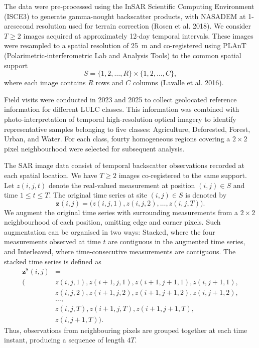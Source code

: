 \documentclass[
  conference]{IEEEtran}
\begin{document}
The data were pre-processed using the InSAR Scientific Computing
Environment (ISCE3) to generate gamma-nought backscatter products, with
NASADEM at 1-arcsecond resolution used for terrain correction (Rosen et
al. 2018). We consider \(T\geq2\) images acquired at approximately
12-day temporal intervals. These images were resampled to a spatial
resolution of \SI{25}{\meter} and co-registered using PLAnT
(Polarimetric-interferometric Lab and Analysis Tools) to the common
spatial support \[
S=\{1,2,\dots,R\}\times\{1,2,\dots,C\},
\] where each image contains \(R\) rows and \(C\) columns (Lavalle et
al. 2016).

Field visits were conducted in 2023 and 2025 to collect geolocated
reference information for different LULC classes. This information was
combined with photo-interpretation of temporal high-resolution optical
imagery to identify representative samples belonging to five classes:
Agriculture, Deforested, Forest, Urban, and Water. For each class,
fourty homogeneous regions covering a \(2\times2\) pixel neighbourhood
were selected for subsequent analysis.

The SAR image data consist of temporal backscatter observations recorded
at each spatial location. We have \(T\geq2\) images co-registered to the
same support. Let \(z(i,j,t)\) denote the real-valued measurement at
position \((i,j)\in S\) and time \(1\leq t\leq T\). The original time
series at site \((i,j)\in S\) is denoted by \[
\mathbf z(i,j)
=
\big(z(i,j,1), z(i,j,2), \dots, z(i,j,T)\big).
\] We augment the original time series with surrounding measurements
from a \(2\times 2\) neighbourhood of each position, omitting edge and
corner pixels. Such augmentation can be organised in two ways: Stacked,
where the four measurements observed at time \(t\) are contiguous in the
augmented time series, and Interleaved, where time-consecutive
measurements are contiguous. The stacked time series is defined as \[
\begin{aligned}
\mathbf z^{\mathrm S}(i,j)
&=\\
\Big(&
z(i,j,1), z(i+1,j,1), z(i+1,j+1,1), z(i,j+1,1),\\
&
z(i,j,2), z(i+1,j,2), z(i+1,j+1,2), z(i,j+1,2),\\
&
\dots,\\
&
z(i,j,T), z(i+1,j,T), z(i+1,j+1,T),\\
&
z(i,j+1,T)
\Big).
\end{aligned}
\] Thus, observations from neighbouring pixels are grouped together at
each time instant, producing a sequence of length \(4T\).
\end{document}
